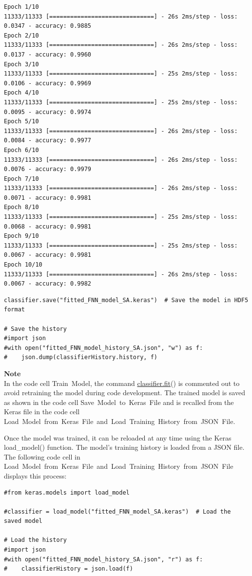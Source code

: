 \begin{verbatim}
Epoch 1/10
11333/11333 [==============================] - 26s 2ms/step - loss: 0.0347 - accuracy: 0.9885
Epoch 2/10
11333/11333 [==============================] - 26s 2ms/step - loss: 0.0137 - accuracy: 0.9960
Epoch 3/10
11333/11333 [==============================] - 25s 2ms/step - loss: 0.0106 - accuracy: 0.9969
Epoch 4/10
11333/11333 [==============================] - 25s 2ms/step - loss: 0.0095 - accuracy: 0.9974
Epoch 5/10
11333/11333 [==============================] - 26s 2ms/step - loss: 0.0084 - accuracy: 0.9977
Epoch 6/10
11333/11333 [==============================] - 26s 2ms/step - loss: 0.0076 - accuracy: 0.9979
Epoch 7/10
11333/11333 [==============================] - 26s 2ms/step - loss: 0.0071 - accuracy: 0.9981
Epoch 8/10
11333/11333 [==============================] - 25s 2ms/step - loss: 0.0068 - accuracy: 0.9981
Epoch 9/10
11333/11333 [==============================] - 25s 2ms/step - loss: 0.0067 - accuracy: 0.9981
Epoch 10/10
11333/11333 [==============================] - 26s 2ms/step - loss: 0.0067 - accuracy: 0.9982
\end{verbatim}

\begin{verbatim}
classifier.save("fitted_FNN_model_SA.keras")  # Save the model in HDF5 format

# Save the history
#import json
#with open("fitted_FNN_model_history_SA.json", "w") as f:
#    json.dump(classifierHistory.history, f)
\end{verbatim}

\begin{framed}
\textbf{Note}\\
In the code cell Train~Model, the command \href{http://classifier.fit}{classifier.fit}() is commented out to avoid retraining the model during code development.  The trained model is saved as shown in the code cell Save~Model~to~Keras~File and is recalled from the Keras file in the code cell Load~Model~from~Keras~File~and~Load~Training~History~from~JSON~File.
\end{framed}

Once the model was trained, it can be reloaded at any time using the Keras load\_model() function.  The model's training history is loaded from a JSON file.  The following code cell in Load~Model~from~Keras~File~and~Load~Training~History~from~JSON~File displays this process:

\begin{verbatim}
#from keras.models import load_model

#classifier = load_model("fitted_FNN_model_SA.keras")  # Load the saved model

# Load the history
#import json
#with open("fitted_FNN_model_history_SA.json", "r") as f:
#    classifierHistory = json.load(f)
\end{verbatim}

